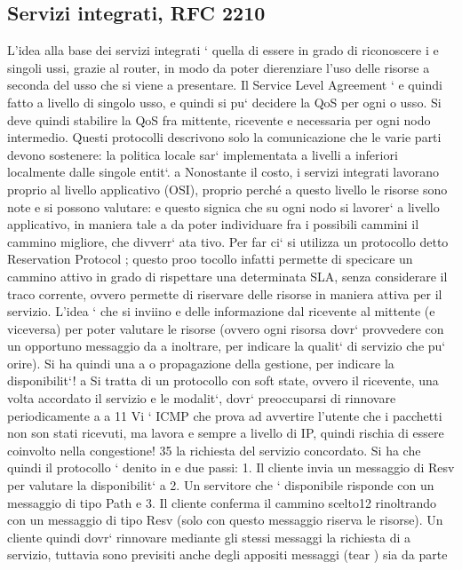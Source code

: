 \documentclass[a4paper,12pt]{article}
\begin{document}
\subsection{Servizi integrati, RFC 2210}
L'idea alla base dei servizi integrati ` quella di essere in grado di riconoscere i
e
singoli ussi, grazie al router, in modo da poter dierenziare l'uso delle risorse
a seconda del usso che si viene a presentare. Il Service Level Agreement `
e
quindi fatto a livello di singolo usso, e quindi si pu` decidere la QoS per ogni
o
usso. Si deve quindi stabilire la QoS fra mittente, ricevente e necessaria per
ogni nodo intermedio. Questi protocolli descrivono solo la comunicazione che
le varie parti devono sostenere: la politica locale sar` implementata a livelli
a
inferiori localmente dalle singole entit`.
a
Nonostante il costo, i servizi integrati lavorano proprio al livello applicativo
(OSI), proprio perché a questo livello le risorse sono note e si possono valutare:
e
questo signica che su ogni nodo si lavorer` a livello applicativo, in maniera tale
a
da poter individuare fra i possibili cammini il cammino migliore, che divverr` ata
tivo. Per far ci` si utilizza un protocollo detto Reservation Protocol ; questo proo
tocollo infatti permette di specicare un cammino attivo in grado di rispettare
una determinata SLA, senza considerare il traco corrente, ovvero permette di
riservare delle risorse in maniera attiva per il servizio. L'idea ` che si inviino
e
delle informazione dal ricevente al mittente (e viceversa) per poter valutare le
risorse (ovvero ogni risorsa dovr` provvedere con un opportuno messaggio da
a
inoltrare, per indicare la qualit` di servizio che pu` orire). Si ha quindi una
a
o
propagazione della gestione, per indicare la disponibilit`!
a
Si tratta di un protocollo con soft state, ovvero il ricevente, una volta accordato il servizio e le modalit`, dovr`
preoccuparsi di rinnovare periodicamente
a
a
11 Vi ` ICMP che prova ad avvertire l'utente che i pacchetti non son stati ricevuti, ma lavora
e
sempre a livello di IP, quindi rischia di essere coinvolto nella congestione!
35
la richiesta del servizio concordato. Si ha che quindi il protocollo ` denito in
e
due passi:
1. Il cliente invia un messaggio di Resv per valutare la disponibilit`
a
2. Un servitore che ` disponibile risponde con un messaggio di tipo Path
e
3. Il cliente conferma il cammino scelto12 rinoltrando con un messaggio di
tipo Resv (solo con questo messaggio riserva le risorse).
Un cliente quindi dovr` rinnovare mediante gli stessi messaggi la richiesta di
a
servizio, tuttavia sono previsiti anche degli appositi messaggi (tear ) sia da parte
\end{document}
